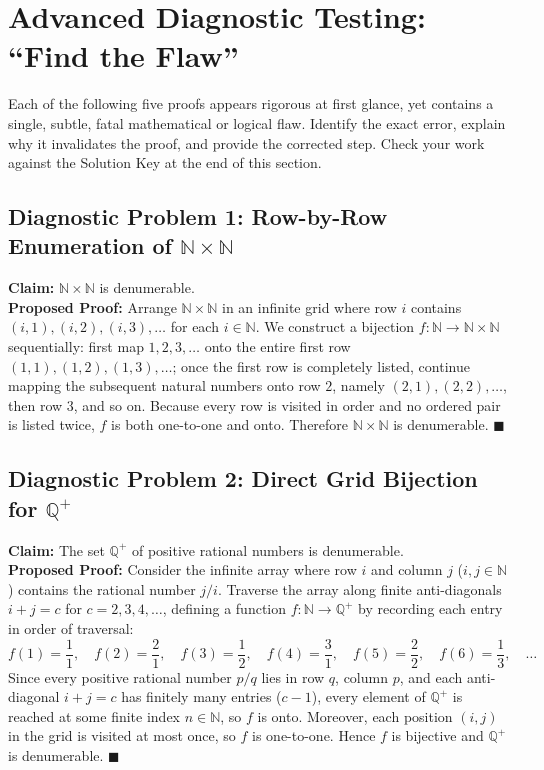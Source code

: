 \documentclass[11pt, letterpaper]{article}
\theoremstyle{definition}
\theoremstyle{remark}
\begin{document}
\section{Advanced Diagnostic Testing: ``Find the Flaw''}

Each of the following five proofs appears rigorous at first glance, yet contains a single, subtle, fatal mathematical or logical flaw. Identify the exact error, explain why it invalidates the proof, and provide the corrected step. Check your work against the Solution Key at the end of this section.

\subsection{Diagnostic Problem 1: Row-by-Row Enumeration of $\mathbb{N} \times \mathbb{N}$}
\textbf{Claim:} $\mathbb{N} \times \mathbb{N}$ is denumerable.\\
\textbf{Proposed Proof:} Arrange $\mathbb{N} \times \mathbb{N}$ in an infinite grid where row $i$ contains $(i, 1), (i, 2), (i, 3), \dots$ for each $i \in \mathbb{N}$. We construct a bijection $f : \mathbb{N} \to \mathbb{N} \times \mathbb{N}$ sequentially: first map $1, 2, 3, \dots$ onto the entire first row $(1, 1), (1, 2), (1, 3), \dots$; once the first row is completely listed, continue mapping the subsequent natural numbers onto row $2$, namely $(2, 1), (2, 2), \dots$, then row $3$, and so on. Because every row is visited in order and no ordered pair is listed twice, $f$ is both one-to-one and onto. Therefore $\mathbb{N} \times \mathbb{N}$ is denumerable. $\blacksquare$

\subsection{Diagnostic Problem 2: Direct Grid Bijection for $\mathbb{Q}^+$}
\textbf{Claim:} The set $\mathbb{Q}^+$ of positive rational numbers is denumerable.\\
\textbf{Proposed Proof:} Consider the infinite array where row $i$ and column $j$ ($i, j \in \mathbb{N}$) contains the rational number $j/i$. Traverse the array along finite anti-diagonals $i + j = c$ for $c = 2, 3, 4, \dots$, defining a function $f : \mathbb{N} \to \mathbb{Q}^+$ by recording each entry in order of traversal:
\[
f(1) = \frac{1}{1},\quad f(2) = \frac{2}{1},\quad f(3) = \frac{1}{2},\quad f(4) = \frac{3}{1},\quad f(5) = \frac{2}{2},\quad f(6) = \frac{1}{3},\quad \dots
\]
Since every positive rational number $p/q$ lies in row $q$, column $p$, and each anti-diagonal $i + j = c$ has finitely many entries ($c - 1$), every element of $\mathbb{Q}^+$ is reached at some finite index $n \in \mathbb{N}$, so $f$ is onto. Moreover, each position $(i, j)$ in the grid is visited at most once, so $f$ is one-to-one. Hence $f$ is bijective and $\mathbb{Q}^+$ is denumerable. $\blacksquare$
\end{document}
